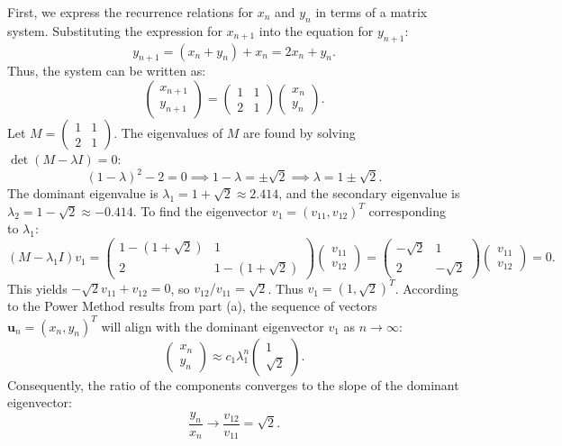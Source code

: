 \begin{solution}
First, we express the recurrence relations for $x_n$ and $y_n$ in terms of a matrix system. Substituting the expression for $x_{n+1}$ into the equation for $y_{n+1}$:
\[ y_{n+1} = (x_n + y_n) + x_n = 2x_n + y_n. \]
Thus, the system can be written as:
\begin{equation}
    \begin{pmatrix} x_{n+1} \\ y_{n+1} \end{pmatrix} = \begin{pmatrix} 1 & 1 \\ 2 & 1 \end{pmatrix} \begin{pmatrix} x_n \\ y_n \end{pmatrix}. \label{eq:matrix_system_applied}
\end{equation}
Let $M = \begin{pmatrix} 1 & 1 \\ 2 & 1 \end{pmatrix}$. The eigenvalues of $M$ are found by solving $\det(M - \lambda I) = 0$:
\[ (1-\lambda)^2 - 2 = 0 \implies 1-\lambda = \pm\sqrt{2} \implies \lambda = 1 \pm \sqrt{2}. \]
The dominant eigenvalue is $\lambda_1 = 1 + \sqrt{2} \approx 2.414$, and the secondary eigenvalue is $\lambda_2 = 1 - \sqrt{2} \approx -0.414$.
To find the eigenvector $v_1 = (v_{11}, v_{12})^T$ corresponding to $\lambda_1$:
\[ (M - \lambda_1 I) v_1 = \begin{pmatrix} 1 - (1+\sqrt{2}) & 1 \\ 2 & 1 - (1+\sqrt{2}) \end{pmatrix} \begin{pmatrix} v_{11} \\ v_{12} \end{pmatrix} = \begin{pmatrix} -\sqrt{2} & 1 \\ 2 & -\sqrt{2} \end{pmatrix} \begin{pmatrix} v_{11} \\ v_{12} \end{pmatrix} = 0. \]
This yields $-\sqrt{2} v_{11} + v_{12} = 0$, so $v_{12}/v_{11} = \sqrt{2}$. Thus $v_1 = (1, \sqrt{2})^T$.
According to the Power Method results from part (a), the sequence of vectors $\mathbf{u}_n = (x_n, y_n)^T$ will align with the dominant eigenvector $v_1$ as $n \to \infty$:
\[ \begin{pmatrix} x_n \\ y_n \end{pmatrix} \approx c_1 \lambda_1^n \begin{pmatrix} 1 \\ \sqrt{2} \end{pmatrix}. \]
Consequently, the ratio of the components converges to the slope of the dominant eigenvector:
\[ \frac{y_n}{x_n} \to \frac{v_{12}}{v_{11}} = \sqrt{2}. \]
\end{solution}

